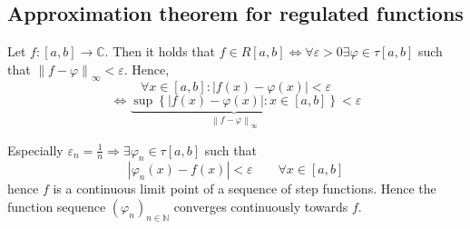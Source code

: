 \documentclass[a4paper,landscape,twocolumn]{article}
\theoremstyle{definition}
\newcommand\set[1]{\left\{#1\right\}}
\newcommand\abs[1]{\left|#1\right|}
\newcommand\norm[1]{\left\|#1\right\|}
\begin{document}
\subsection{Approximation theorem for regulated functions}

Let $f: [a,b] \to \mathbb C$. Then it holds that $f \in R[a,b] \Leftrightarrow \forall \varepsilon > 0 \exists \varphi \in \tau[a,b]$ such that $\norm{f - \varphi}_{\infty} < \varepsilon$. Hence,
\[ \forall x \in [a,b]: \abs{f(x) - \varphi(x)} < \varepsilon \]
\[ \Leftrightarrow \underbrace{\sup\set{\abs{f(x) - \varphi(x)}: x \in [a,b]}}_{\norm{f - \varphi}_{\infty}} < \varepsilon \]

Especially $\varepsilon_n = \frac1n \Rightarrow \exists \varphi_n \in \tau[a,b]$ such that
\[ \abs{\varphi_n(x) - f(x)} < \varepsilon \qquad \forall x \in [a,b] \]
hence $f$ is a continuous limit point of a sequence of step functions.
Hence the function sequence $(\varphi_n)_{n\in\mathbb N}$ converges continuously towards $f$.
\end{document}
